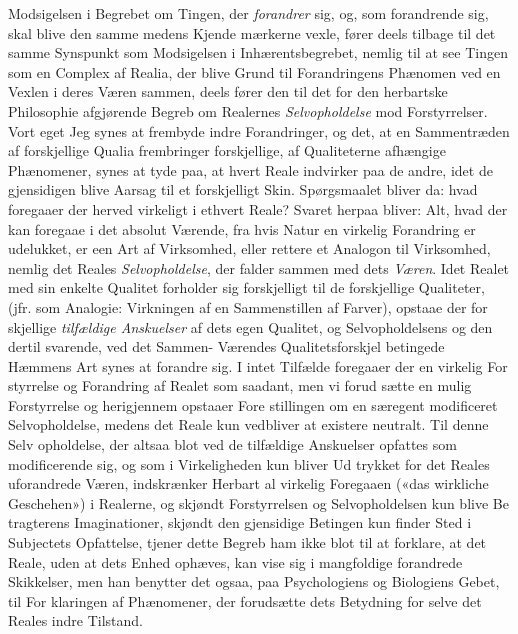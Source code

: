 \documentclass[12pt,a4paper]{book}
\begin{document}
Modsigelsen i Begrebet om Tingen, der \emph{forandrer} sig,
og, som forandrende sig, skal blive den samme medens Kjende\-%
mærkerne vexle, fører deels tilbage til det samme Synspunkt
som Modsigelsen i Inhærentsbegrebet, nemlig til at see Tingen
som en Complex af Realia, der blive Grund til Forandringens
Phænomen ved en Vexlen i deres Væren sammen, deels fører
den til det for den herbartske Philosophie afgjørende Begreb
om Realernes \emph{Selvopholdelse} mod Forstyrrelser. Vort eget
Jeg synes at frembyde indre Forandringer, og det, at en
Sammentræden af forskjellige Qualia frembringer forskjellige,
af Qualiteterne afhængige Phænomener, synes at tyde paa, at
hvert Reale indvirker paa de andre, idet de gjensidigen blive
Aarsag til et forskjelligt Skin. Spørgsmaalet bliver da: hvad
foregaaer der herved virkeligt i ethvert Reale? Svaret herpaa
bliver: Alt, hvad der kan foregaae i det absolut Værende, fra
hvis Natur en virkelig Forandring er udelukket, er een Art af
Virksomhed, eller rettere et Analogon til Virksomhed, nemlig
det Reales \emph{Selvopholdelse}, der falder sammen med dets
\emph{Væren}. Idet Realet med sin enkelte Qualitet forholder sig
forskjelligt til de forskjellige Qualiteter, (jfr. som Analogie:
Virkningen af en Sammenstillen af Farver), opstaae der for\-%
skjellige \emph{tilfældige Anskuelser} af dets egen Qualitet, og
Selvopholdelsens og den dertil svarende, ved det Sammen-%
Værendes Qualitetsforskjel betingede Hæmmens Art synes at
forandre sig. I intet Tilfælde foregaaer der en virkelig For\-%
styrrelse og Forandring af Realet som saadant, men vi forud\-%
sætte en mulig Forstyrrelse og herigjennem opstaaer Fore\-%
stillingen om en særegent modificeret Selvopholdelse, medens
det Reale kun vedbliver at existere neutralt. Til denne Selv\-%
opholdelse, der altsaa blot ved de tilfældige Anskuelser opfattes
som modificerende sig, og som i Virkeligheden kun bliver Ud\-%
trykket for det Reales uforandrede Væren, indskrænker Herbart
al virkelig Foregaaen («das wirkliche Geschehen») i Realerne,
og skjøndt Forstyrrelsen og Selvopholdelsen kun blive Be\-%
tragterens Imaginationer, skjøndt den gjensidige Betingen kun
finder Sted i Subjectets Opfattelse, tjener dette Begreb ham ikke
blot til at forklare, at det Reale, uden at dets Enhed ophæves, kan
vise sig i mangfoldige forandrede Skikkelser, men han benytter
det ogsaa, paa Psychologiens og Biologiens Gebet, til For\-%
klaringen af Phænomener, der forudsætte dets Betydning for
selve det Reales indre Tilstand.
\end{document}
